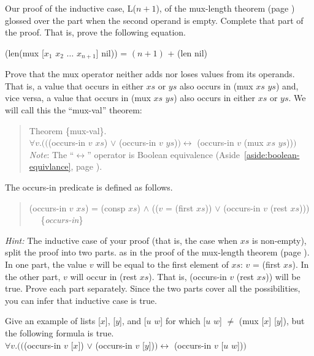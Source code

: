 \begin{ExerciseList}
\Exercise
Our proof of the inductive case, L($n+1$), of the mux-length theorem
(page \pageref{mux-length-thm-induc-case})
glossed over the part when the second operand is empty.
Complete that part of the proof. That is, prove the following equation.

\hspace{1cm} (len(mux [$x_1$ $x_2$ $\dots$ $x_{n+1}$] nil)) = $(n+1)$ + (len nil)

\Exercise [label={ex:mul-val-thm}]
Prove that the mux operator neither adds nor loses values from its operands.
That is, a value that occurs in either $xs$ or $ys$ also occurs in (mux $xs$ $ys$)
and, vice versa, a value that occurs in (mux $xs$ $ys$) also occurs in either $xs$ or $ys$.
We will call this the ``mux-val'' theorem:

\begin{quote}
\label{thm:mux-val}
Theorem \{mux-val\}.\\
$\forall v.(($(occurs-in $v$ $xs$) $\vee$ (occurs-in $v$ $ys$)$) \leftrightarrow$ (occurs-in $v$ (mux $xs$ $ys$))$)$ \\
\emph{Note}: The ``$\leftrightarrow$'' operator
is Boolean equivalence (Aside~\ref{aside:boolean-equivlance}, page \pageref{aside:boolean-equivlance}).
\end{quote}

The occurs-in predicate is defined as follows.
\begin{quote}
\label{def:occurs-in}
(occurs-in $v$ $xs$) = (consp $xs$) $\wedge$ (($v$ = (first $xs$)) $\vee$ (occurs-in $v$ (rest $xs$))) ~~ \{\emph{occurs-in}\}
\end{quote}

\emph{Hint:} The inductive case of your proof
(that is, the case when $xs$ is non-empty),
split the proof into two parts.
as in the proof of the mux-length theorem (page \pageref{mux-length-thm}).
In one part, the value $v$ will be equal to
the first element of $xs$:
$v$ = (first $xs$).
In the other part, $v$ will occur in (rest $xs$).
That is, (occurs-in $v$ (rest $xs$)) will be true.
Prove each part separately.
Since the two parts cover all the possibilities,
you can infer that inductive case is true.

\Exercise\label{mux-val-len-not-enough}
Give an example of lists [$x$], [$y$], and [$u$ $w$] for which 
[$u$ $w$] $\neq$ (mux [$x$] [$y$]), but the following formula is true.\\
\hspace*{1cm}$\forall v.(($(occurs-in $v$ [$x$]) $\vee$ (occurs-in $v$ [$y$])$)
\leftrightarrow$ (occurs-in $v$ [$u$ $w$])$)$


\end{ExerciseList}
